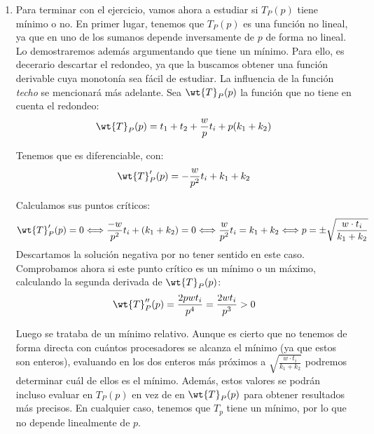 \begin{ejercicio}
\begin{enumerate}
        \item Para terminar con el ejercicio, vamos ahora a estudiar si $T_P(p)$ tiene mínimo o no.
        En primer lugar, tenemos que $T_P(p)$ es una función no lineal, ya que en uno de los sumanos depende inversamente de $p$ de forma no lineal. Lo demostraremos además argumentando que tiene un mínimo.
        Para ello, es decerario descartar el redondeo, ya que la buscamos obtener una función derivable cuya monotonía sea fácil de estudiar. La influencia de la
        función \emph{techo} se mencionará más adelante. Sea $\wt{T}_P(p)$ la función que no tiene en cuenta el redondeo:
        \begin{equation*}
            \wt{T}_P(p) = t_1 + t_2 + \dfrac{w}{p}t_i + p(k_1+k_2)
        \end{equation*}

        Tenemos que es diferenciable, con:
        \begin{equation*}
            \wt{T}_P'(p) = -\dfrac{w}{p^2}t_i + k_1 + k_2
        \end{equation*}
        
        Calculamos sus puntos críticos:
        \begin{equation*}
            \wt{T}_P'(p) = 0 \Longleftrightarrow \dfrac{-w}{p^2}t_i + (k_1+k_2) = 0 \Longleftrightarrow \dfrac{w}{p^2}t_i=k_1 + k_2 \Longleftrightarrow p = \pm \sqrt{\dfrac{w\cdot t_i}{k_1+k_2}}
        \end{equation*}
        Descartamos la solución negativa por no tener sentido en este caso. Comprobamos ahora si este punto crítico es un mínimo o un máximo, calculando la segunda derivada de $\wt{T}_P(p)$:
        \begin{equation*}
            \wt{T}_P''(p)= \dfrac{2pwt_i}{p^4} = \dfrac{2wt_i}{p^3} > 0
        \end{equation*}

        Luego se trataba de un mínimo relativo. Aunque es cierto que no tenemos de forma directa con cuántos procesadores se alcanza el mínimo (ya que estos son enteros),
        evaluando en los dos enteros más próximos a $\sqrt{\frac{w\cdot t_i}{k_1+k_2}}$ podremos determinar cuál de ellos es el mínimo.
        Además, estos valores se podrán incluso evaluar en $T_P(p)$ en vez de en $\wt{T}_P(p)$ para obtener resultados más precisos. En cualquier caso,
        tenemos que $T_p$ tiene un mínimo, por lo que no depende linealmente de $p$.
    \end{enumerate}
\end{ejercicio}

